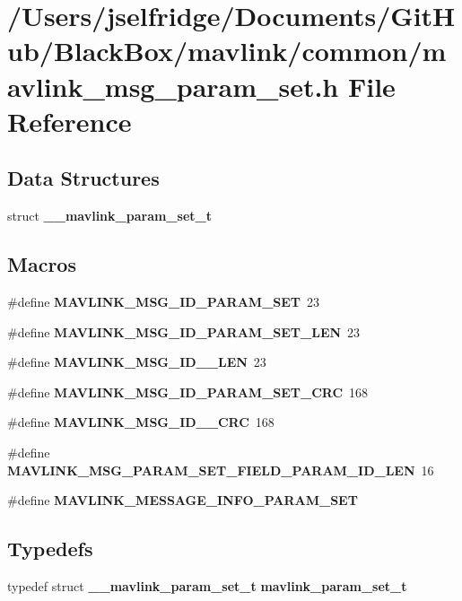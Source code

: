 \section{/\+Users/jselfridge/\+Documents/\+Git\+Hub/\+Black\+Box/mavlink/common/mavlink\+\_\+msg\+\_\+param\+\_\+set.h File Reference}
\label{mavlink__msg__param__set_8h}
\subsection*{Data Structures}
\begin{DoxyCompactItemize}
\item 
struct \textbf{ \+\_\+\+\_\+mavlink\+\_\+param\+\_\+set\+\_\+t}
\end{DoxyCompactItemize}
\subsection*{Macros}
\begin{DoxyCompactItemize}
\item 
\#define \textbf{ M\+A\+V\+L\+I\+N\+K\+\_\+\+M\+S\+G\+\_\+\+I\+D\+\_\+\+P\+A\+R\+A\+M\+\_\+\+S\+ET}~23
\item 
\#define \textbf{ M\+A\+V\+L\+I\+N\+K\+\_\+\+M\+S\+G\+\_\+\+I\+D\+\_\+\+P\+A\+R\+A\+M\+\_\+\+S\+E\+T\+\_\+\+L\+EN}~23
\item 
\#define \textbf{ M\+A\+V\+L\+I\+N\+K\+\_\+\+M\+S\+G\+\_\+\+I\+D\+\_\+\_\+\+L\+EN}~23
\item 
\#define \textbf{ M\+A\+V\+L\+I\+N\+K\+\_\+\+M\+S\+G\+\_\+\+I\+D\+\_\+\+P\+A\+R\+A\+M\+\_\+\+S\+E\+T\+\_\+\+C\+RC}~168
\item 
\#define \textbf{ M\+A\+V\+L\+I\+N\+K\+\_\+\+M\+S\+G\+\_\+\+I\+D\+\_\+\_\+\+C\+RC}~168
\item 
\#define \textbf{ M\+A\+V\+L\+I\+N\+K\+\_\+\+M\+S\+G\+\_\+\+P\+A\+R\+A\+M\+\_\+\+S\+E\+T\+\_\+\+F\+I\+E\+L\+D\+\_\+\+P\+A\+R\+A\+M\+\_\+\+I\+D\+\_\+\+L\+EN}~16
\item 
\#define \textbf{ M\+A\+V\+L\+I\+N\+K\+\_\+\+M\+E\+S\+S\+A\+G\+E\+\_\+\+I\+N\+F\+O\+\_\+\+P\+A\+R\+A\+M\+\_\+\+S\+ET}
\end{DoxyCompactItemize}
\subsection*{Typedefs}
\begin{DoxyCompactItemize}
\item 
typedef struct \textbf{ \+\_\+\+\_\+mavlink\+\_\+param\+\_\+set\+\_\+t} \textbf{ mavlink\+\_\+param\+\_\+set\+\_\+t}
\end{DoxyCompactItemize}



